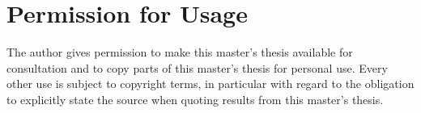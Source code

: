 \chapter*{Permission for Usage}

The author gives permission to make this master’s thesis available for consultation and to copy parts of this master’s thesis for personal use. Every other use is subject to copyright terms, in particular with regard to the obligation to explicitly state the source when quoting results from this master’s thesis.

